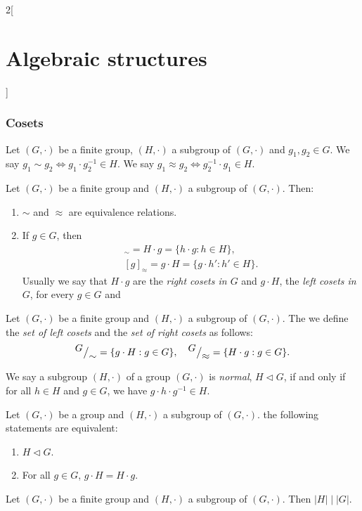 \documentclass[class=article,10pt,crop=false]{standalone}
\begin{document}
\begin{multicols}{2}[\section{Algebraic structures}]
\subsubsection*{Cosets}
\begin{definition}
Let $(G,\cdot)$ be a finite group, $(H,\cdot)$ a subgroup of $(G,\cdot)$ and $g_1,g_2\in G$. We say $g_1\sim g_2\iff g_1\cdot g_2^{-1}\in H$. We say $g_1\approx g_2\iff g_2^{-1}\cdot g_1\in H$.
\end{definition}
\begin{lemma}
Let $(G,\cdot)$ be a finite group and $(H,\cdot)$ a subgroup of $(G,\cdot)$. Then:
\begin{enumerate}
    \item $\sim$ and $\approx$ are equivalence relations.
    \item If $g\in G$, then 
    \begin{gather*}
        [g]_\sim=H\cdot g=\{h\cdot g:h\in H\},\\ [g]_\approx=g\cdot H=\{g\cdot h':h'\in H\}.
    \end{gather*}
    Usually we say that $H\cdot g$ are the \textit{right cosets in $G$} and $g\cdot H$, the \textit{left cosets in $G$}, for every $g\in G$ and 
\end{enumerate}
\end{lemma}
\begin{definition}
Let $(G,\cdot)$ be a finite group and $(H,\cdot)$ a subgroup of $(G,\cdot)$. The we define the \textit{set of left cosets} and the \textit{set of right cosets} as follows:
$${^{\textstyle G}\big/_{\textstyle \sim}}=\{g\cdot H:g\in G\},\quad{^{\textstyle G}\big/_{\textstyle \approx}}=\{H\cdot g:g\in G\}.$$
\end{definition}
\begin{definition}
We say a subgroup $(H,\cdot)$ of a group $(G,\cdot)$ is \textit{normal}, $H\lhd G$, if and only if for all $h\in H$ and $g\in G$, we have $g\cdot h\cdot g^{-1}\in H$.
\end{definition}
\begin{prop}
Let $(G,\cdot)$ be a group and $(H,\cdot)$ a subgroup of $(G,\cdot)$. the following statements are equivalent:
\begin{enumerate}
    \item $H\lhd G$.
    \item For all $g\in G$, $g\cdot H=H\cdot g$.
\end{enumerate}
\end{prop}
\begin{theorem}
Let $(G,\cdot)$ be a finite group and $(H,\cdot)$ a subgroup of $(G,\cdot)$. Then $|H|\mid|G|$.

\end{theorem}
\end{multicols}
\end{document}
